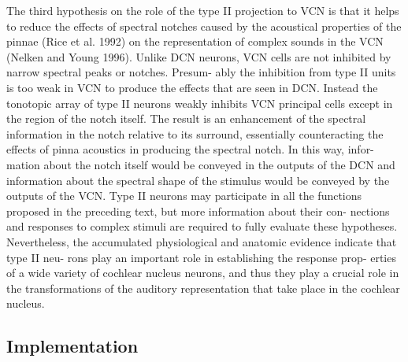 {The third hypothesis on the role of the type II projection to
VCN is that it helps to reduce the effects of spectral notches
caused by the acoustical properties of the pinnae (Rice et al.
1992) on the representation of complex sounds in the VCN
(Nelken and Young 1996). Unlike DCN neurons, VCN cells
are not inhibited by narrow spectral peaks or notches. Presum-
ably the inhibition from type II units is too weak in VCN to
produce the effects that are seen in DCN. Instead the tonotopic
array of type II neurons weakly inhibits VCN principal cells
except in the region of the notch itself. The result is an
enhancement of the spectral information in the notch relative to
its surround, essentially counteracting the effects of pinna
acoustics in producing the spectral notch. In this way, infor-
mation about the notch itself would be conveyed in the outputs
of the DCN and information about the spectral shape of the
stimulus would be conveyed by the outputs of the VCN.
Type II neurons may participate in all the functions proposed
in the preceding text, but more information about their con-
nections and responses to complex stimuli are required to fully
evaluate these hypotheses. Nevertheless, the accumulated
physiological and anatomic evidence indicate that type II neu-
rons play an important role in establishing the response prop-
erties of a wide variety of cochlear nucleus neurons, and thus
they play a crucial role in the transformations of the auditory
representation that take place in the cochlear nucleus.





}


\subsection{Implementation}

